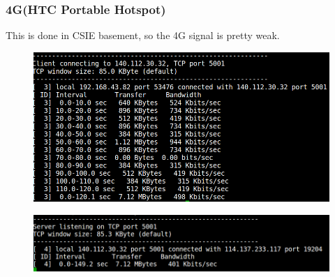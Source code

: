 \documentclass{article}
\begin{document}
        \subsubsection{4G(HTC Portable Hotspot)}
            This is done in CSIE basement, so the 4G signal is pretty weak.
            \begin{figure}[!htb]
                \begin{flushleft}
                \includegraphics[scale=0.4]{4G.png}
                \end{flushleft}
            \end{figure}
            \begin{figure}[!htb]
                \begin{flushleft}
                \includegraphics[scale=0.4]{4G1.png}
                \end{flushleft}
            \end{figure}
        \newpage
\end{document}

